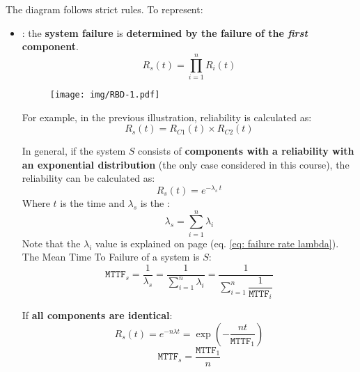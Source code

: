 \highspace
The diagram follows strict rules. To represent:
\begin{itemize}
    \item {}: the \textbf{system failure} is \textbf{determined by the failure of the \emph{first} component}.
    \begin{equation}
        R_{s}\left(t\right) = \prod_{i=1}^{n} R_{i}\left(t\right)
    \end{equation}
    \begin{figure}[!htp]
        \centering
        \texttt{[image: img/RBD-1.pdf]}
    \end{figure}

    For example, in the previous illustration, reliability is calculated as:
    \begin{equation*}
        R_{s}\left(t\right) = R_{C1}\left(t\right) \times R_{C2}\left(t\right)
    \end{equation*}

    In general, if the system $S$ consists of \textbf{components with a reliability with an exponential distribution} (the only case considered in this course), the reliability can be calculated as:
    \begin{equation}
        R_{s}\left(t\right) = e^{-\lambda_{s} \: t}
    \end{equation}
    Where $t$ is the time and $\lambda_{s}$ is the :
    \begin{equation}
        \lambda_{s} = \displaystyle\sum_{i=1}^{n}\lambda_{i}
    \end{equation}
    Note that the $\lambda_{i}$ value is explained on page \pageref{eq: failure rate lambda} (eq. \ref{eq: failure rate lambda}). The Mean Time To Failure of a system is $S$:
    \begin{equation}
        \texttt{MTTF}_{s} = \dfrac{1}{\lambda_{s}} = \dfrac{1}{\displaystyle\sum_{i=1}^{n}\lambda_{i}} = \dfrac{1}{
            \displaystyle\sum_{i=1}^{n} \dfrac{1}{\texttt{MTTF}_{i}}
        }
    \end{equation}

    If \textbf{all components are identical}:
    \begin{equation}
        R_{s}\left(t\right) = e^{- n \lambda t} = \exp\left(- \dfrac{n t}{\texttt{MTTF}_{1}}\right)
    \end{equation}
    \begin{equation}
        \texttt{MTTF}_{s} = \dfrac{\texttt{MTTF}_{1}}{n}
    \end{equation}


\end{itemize}
